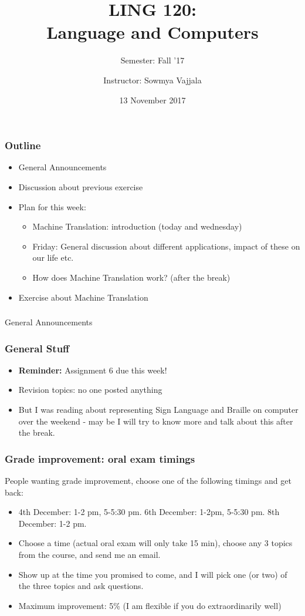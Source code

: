 \documentclass{beamer}
\author[Sowmya Vajjala]{Instructor: Sowmya Vajjala}
\title[LING 120]{LING 120: \\ Language and Computers}
\subtitle{Semester: Fall '17}
\date{13 November 2017}
\institute{Iowa State University, USA}
\begin{document}
\begin{frame}\titlepage
\end{frame}

\begin{frame}
\frametitle{Outline}
\begin{itemize}
\item General Announcements
\item Discussion about previous exercise
\item Plan for this week: 
\begin{itemize}
\item Machine Translation: introduction (today and wednesday)
\item Friday: General discussion about different applications, impact of these on our life etc. 
\item How does Machine Translation work? (after the break)
\end{itemize}
\item Exercise about Machine Translation
\end{itemize}
\end{frame}

\begin{frame}
\frametitle{}
\Large General Announcements
\end{frame}

\begin{frame}
\frametitle{General Stuff}
\begin{itemize}
\item \textbf{Reminder: }Assignment 6 due this week!
\item Revision topics: no one posted anything
\item But I was reading about representing Sign Language and Braille on computer over the weekend - may be I will try to know more and talk about this after the break.
\end{itemize}
\end{frame}

\begin{frame}
\frametitle{Grade improvement: oral exam timings}
People wanting grade improvement, choose one of the following timings and get back:
\begin{itemize}
\item 4th December: 1-2 pm, 5-5:30 pm. 6th December: 1-2pm, 5-5:30 pm. 8th December: 1-2 pm.
\item Choose a time (actual oral exam will only take 15 min), choose any 3 topics from the course, and send me an email.
\item Show up at the time you promised to come, and I will pick one (or two) of the three topics and ask questions.
\item Maximum improvement: 5\% (I am flexible if you do extraordinarily well)
\end{itemize}
\end{frame}
\end{document}

